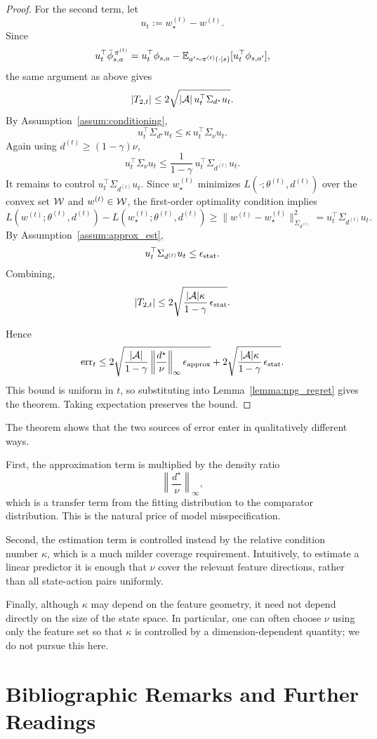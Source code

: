 \begin{proof}
For the second term, let
\[
u_t := w_\star^{(t)}-w^{(t)}.
\]
Since
\[
u_t^\top \bar\phi_{s,a}^{\,\pi^{(t)}}
=
u_t^\top \phi_{s,a}
-
\mathbb{E}_{a'\sim \pi^{(t)}(\cdot|s)}[u_t^\top \phi_{s,a'}],
\]
the same argument as above gives
\[
|T_{2,t}|
\le
2\sqrt{|\mathcal{A}|\,u_t^\top \Sigma_{d^\star}u_t}.
\]
By Assumption~\ref{assum:conditioning},
\[
u_t^\top \Sigma_{d^\star}u_t
\le
\kappa\,u_t^\top \Sigma_\nu u_t.
\]
Again using $d^{(t)}\ge (1-\gamma)\nu$,
\[
u_t^\top \Sigma_\nu u_t
\le
\frac{1}{1-\gamma}\,u_t^\top \Sigma_{d^{(t)}}u_t.
\]
It remains to control $u_t^\top \Sigma_{d^{(t)}}u_t$. Since
$w_\star^{(t)}$ minimizes $L(\cdot;\theta^{(t)},d^{(t)})$ over the convex set $\mathcal{W}$ and
$w^{(t)}\in\mathcal{W}$, the first-order optimality condition implies
\[
L(w^{(t)};\theta^{(t)},d^{(t)})
-
L(w_\star^{(t)};\theta^{(t)},d^{(t)})
\ge
\|w^{(t)}-w_\star^{(t)}\|_{\Sigma_{d^{(t)}}}^2
=
u_t^\top \Sigma_{d^{(t)}}u_t.
\]
By Assumption~\ref{assum:approx_est},
\[
u_t^\top \Sigma_{d^{(t)}}u_t \le \epsilon_{\mathrm{stat}}.
\]
Combining,
\[
|T_{2,t}|
\le
2\sqrt{\frac{|\mathcal{A}|\kappa}{1-\gamma}\,\epsilon_{\mathrm{stat}}}.
\]

Hence
\[
\mathrm{err}_t
\le
2\sqrt{\frac{|\mathcal{A}|}{1-\gamma}\left\|\frac{d^\star}{\nu}\right\|_\infty \epsilon_{\mathrm{approx}}}
+
2\sqrt{\frac{|\mathcal{A}|\kappa}{1-\gamma}\,\epsilon_{\mathrm{stat}}}.
\]
This bound is uniform in $t$, so substituting into Lemma~\ref{lemma:npg_regret} gives the theorem.
Taking expectation preserves the bound.
\end{proof}

The theorem shows that the two sources of error enter in qualitatively different ways.

First, the approximation term is multiplied by the density ratio
\[
\left\|\frac{d^\star}{\nu}\right\|_\infty,
\]
which is a transfer term from the fitting distribution to the comparator distribution.
This is the natural price of model misspecification.

Second, the estimation term is controlled instead by the relative condition number $\kappa$,
which is a much milder coverage requirement. Intuitively, to estimate a linear predictor it is
enough that $\nu$ cover the relevant feature directions, rather than all state-action pairs
uniformly.

Finally, although $\kappa$ may depend on the feature geometry, it need not depend directly on
the size of the state space. In particular, one can often choose $\nu$ using only the feature set
so that $\kappa$ is controlled by a dimension-dependent quantity; we do not pursue this here.

\section{Bibliographic Remarks and Further Readings}\label{bib:pg_approx}

